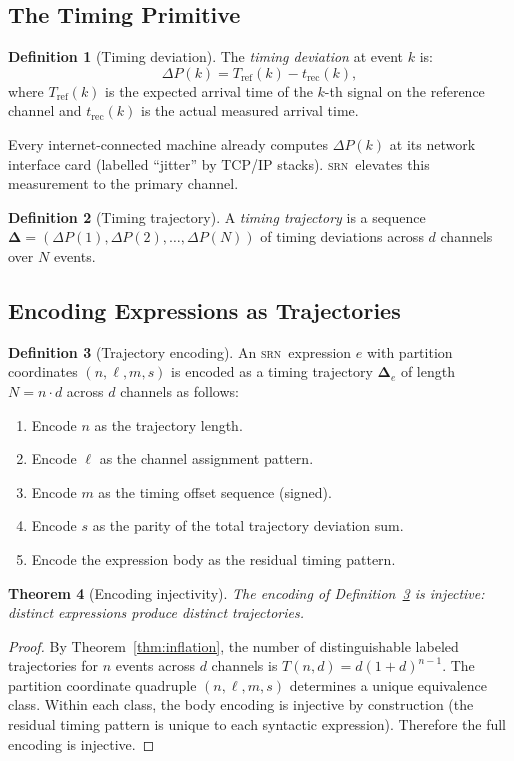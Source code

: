 \documentclass[twocolumn,11pt,a4paper]{article}
\newtheorem{theorem}{Theorem}[section]
\theoremstyle{definition}
\newtheorem{definition}[theorem]{Definition}
\theoremstyle{remark}
\newcommand{\srn}{\textsc{srn}}
\begin{document}
\subsection{The Timing Primitive}

\begin{definition}[Timing deviation]
The \emph{timing deviation} at event $k$ is:
\[
\Delta P(k) = T_{\mathrm{ref}}(k) - t_{\mathrm{rec}}(k),
\]
where $T_{\mathrm{ref}}(k)$ is the expected arrival time of the $k$-th
signal on the reference channel and $t_{\mathrm{rec}}(k)$ is the
actual measured arrival time.
\end{definition}

Every internet-connected machine already computes $\Delta P(k)$
at its network interface card (labelled ``jitter'' by TCP/IP stacks).
\srn\ elevates this measurement to the primary channel.

\begin{definition}[Timing trajectory]
A \emph{timing trajectory} is a sequence
$\boldsymbol{\Delta} = (\Delta P(1), \Delta P(2), \ldots, \Delta P(N))$
of timing deviations across $d$ channels over $N$ events.
\end{definition}

\subsection{Encoding Expressions as Trajectories}

\begin{definition}[Trajectory encoding]
\label{def:encoding}
An \srn\ expression $e$ with partition coordinates $(n, \ell, m, s)$
is encoded as a timing trajectory $\boldsymbol{\Delta}_e$ of length
$N = n \cdot d$ across $d$ channels as follows:
\begin{enumerate}[noitemsep,topsep=2pt]
\item Encode $n$ as the trajectory length.
\item Encode $\ell$ as the channel assignment pattern.
\item Encode $m$ as the timing offset sequence (signed).
\item Encode $s$ as the parity of the total trajectory deviation sum.
\item Encode the expression body as the residual timing pattern.
\end{enumerate}
\end{definition}

\begin{theorem}[Encoding injectivity]
\label{thm:encoding}
The encoding of Definition~\ref{def:encoding} is injective: distinct
expressions produce distinct trajectories.
\end{theorem}
\begin{proof}
By Theorem~\ref{thm:inflation}, the number of distinguishable labeled
trajectories for $n$ events across $d$ channels is $T(n,d) = d(1+d)^{n-1}$.
The partition coordinate quadruple $(n,\ell,m,s)$ determines a unique
equivalence class.  Within each class, the body encoding is injective
by construction (the residual timing pattern is unique to each syntactic
expression).  Therefore the full encoding is injective.
\end{proof}
\end{document}
